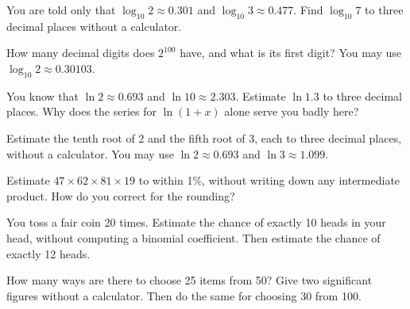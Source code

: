 \begin{question}\label{iq:iv1:mental-technique:32}
You are told only that $\log_{10} 2 \approx 0.301$ and $\log_{10} 3 \approx 0.477$. Find $\log_{10} 7$ to three decimal places without a calculator.
\end{question}

\begin{question}\label{iq:iv1:mental-technique:33}
How many decimal digits does $2^{100}$ have, and what is its first digit? You may use $\log_{10} 2 \approx 0.30103$.
\end{question}

\begin{question}\label{iq:iv1:mental-technique:34}
You know that $\ln 2 \approx 0.693$ and $\ln 10 \approx 2.303$. Estimate $\ln 1.3$ to three decimal places. Why does the series for $\ln(1 + x)$ alone serve you badly here?
\end{question}

\begin{question}\label{iq:iv1:mental-technique:35}
Estimate the tenth root of 2 and the fifth root of 3, each to three decimal places, without a calculator. You may use $\ln 2 \approx 0.693$ and $\ln 3 \approx 1.099$.
\end{question}

\begin{question}\label{iq:iv1:mental-technique:36}
Estimate $47 \times 62 \times 81 \times 19$ to within 1\%, without writing down any intermediate product. How do you correct for the rounding?
\end{question}

\begin{question}\label{iq:iv1:mental-technique:37}
You toss a fair coin 20 times. Estimate the chance of exactly 10 heads in your head, without computing a binomial coefficient. Then estimate the chance of exactly 12 heads.
\end{question}

\begin{question}\label{iq:iv1:mental-technique:38}
How many ways are there to choose 25 items from 50? Give two significant figures without a calculator. Then do the same for choosing 30 from 100.
\end{question}

